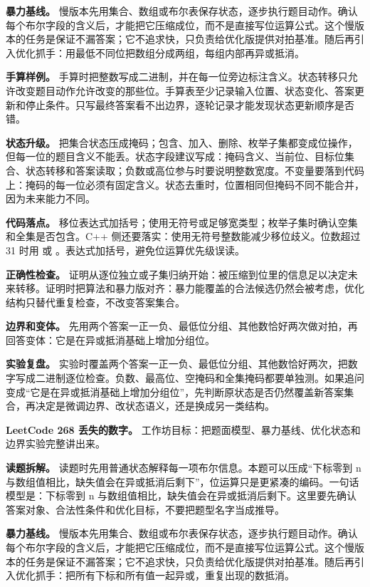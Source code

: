 \textbf{暴力基线。} 慢版本先用集合、数组或布尔表保存状态，逐步执行题目动作。确认每个布尔字段的含义后，才能把它压缩成位，而不是直接写位运算公式。这个慢版本的任务是保证不漏答案；它不追求快，只负责给优化版提供对拍基准。随后再引入优化抓手：用最低不同位把数组分成两组，每组内部再异或抵消。

\textbf{手算样例。} 手算时把整数写成二进制，并在每一位旁边标注含义。状态转移只允许改变题目动作允许改变的那些位。手算表至少记录输入位置、状态变化、答案更新和停止条件。只写最终答案看不出边界，逐轮记录才能发现状态更新顺序是否错。

\textbf{状态升级。} 把集合状态压成掩码；包含、加入、删除、枚举子集都变成位操作，但每一位的题目含义不能丢。状态字段建议写成：掩码含义、当前位、目标位集合、状态转移和答案读取；负数或高位参与时要说明整数宽度。不变量要落到代码上：掩码的每一位必须有固定含义。状态去重时，位置相同但掩码不同不能合并，因为未来能力不同。

\textbf{代码落点。} 移位表达式加括号；使用无符号或足够宽类型；枚举子集时确认空集和全集是否包含。C++ 侧还要落实：使用无符号整数能减少移位歧义。位数超过 31 时用  或 。表达式加括号，避免位运算优先级误读。

\textbf{正确性检查。} 证明从逐位独立或子集归纳开始：被压缩到位里的信息足以决定未来转移。证明时把算法和暴力版对齐：暴力能覆盖的合法候选仍然会被考虑，优化结构只替代重复检查，不改变答案集合。

\textbf{边界和变体。} 先用两个答案一正一负、最低位分组、其他数恰好两次做对拍，再回答变体：它是在异或抵消基础上增加分组位。

\textbf{实验复盘。} 实验时覆盖两个答案一正一负、最低位分组、其他数恰好两次，把数字写成二进制逐位检查。负数、最高位、空掩码和全集掩码都要单独测。如果追问变成“它是在异或抵消基础上增加分组位”，先判断原状态是否仍然覆盖新答案集合，再决定是微调边界、改状态语义，还是换成另一类结构。

\noindent\textbf{LeetCode 268 丢失的数字。} 工作坊目标：把题面模型、暴力基线、优化状态和边界实验完整讲出来。

\textbf{读题拆解。} 读题时先用普通状态解释每一项布尔信息。本题可以压成“下标零到 n 与数组值相比，缺失值会在异或抵消后剩下”，位运算只是更紧凑的编码。一句话模型是：下标零到 n 与数组值相比，缺失值会在异或抵消后剩下。这里要先确认答案对象、合法性条件和优化目标，不要把题型名字当成推导。

\textbf{暴力基线。} 慢版本先用集合、数组或布尔表保存状态，逐步执行题目动作。确认每个布尔字段的含义后，才能把它压缩成位，而不是直接写位运算公式。这个慢版本的任务是保证不漏答案；它不追求快，只负责给优化版提供对拍基准。随后再引入优化抓手：把所有下标和所有值一起异或，重复出现的数抵消。

